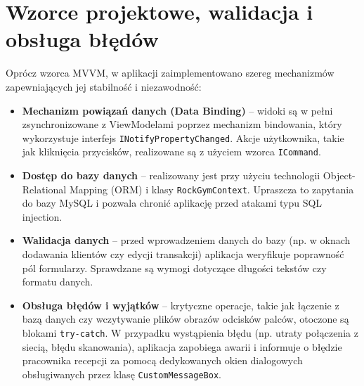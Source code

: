 \section{Wzorce projektowe, walidacja i obsługa błędów}
Oprócz wzorca MVVM, w aplikacji zaimplementowano szereg mechanizmów zapewniających jej stabilność i niezawodność:
\begin{itemize}
    \item \textbf{Mechanizm powiązań danych (Data Binding)} -- widoki są w pełni zsynchronizowane z ViewModelami poprzez mechanizm bindowania, który wykorzystuje interfejs \texttt{INotifyPropertyChanged}. Akcje użytkownika, takie jak kliknięcia przycisków, realizowane są z użyciem wzorca \texttt{ICommand}.
    \item \textbf{Dostęp do bazy danych} -- realizowany jest przy użyciu technologii Object-Relational Mapping (ORM) i klasy \texttt{RockGymContext}. Upraszcza to zapytania do bazy MySQL i pozwala chronić aplikację przed atakami typu SQL injection.
    \item \textbf{Walidacja danych} -- przed wprowadzeniem danych do bazy (np. w oknach dodawania klientów czy edycji transakcji) aplikacja weryfikuje poprawność pól formularzy. Sprawdzane są wymogi dotyczące długości tekstów czy formatu danych.
    \item \textbf{Obsługa błędów i wyjątków} -- krytyczne operacje, takie jak łączenie z bazą danych czy wczytywanie plików obrazów odcisków palców, otoczone są blokami \texttt{try-catch}. W przypadku wystąpienia błędu (np. utraty połączenia z siecią, błędu skanowania), aplikacja zapobiega awarii i informuje o błędzie pracownika recepcji za pomocą dedykowanych okien dialogowych obsługiwanych przez klasę \texttt{CustomMessageBox}.
\end{itemize}
